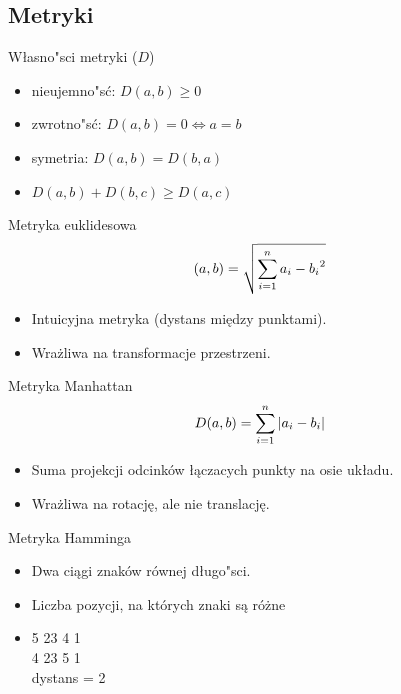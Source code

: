 \subsection{Metryki}
\begin{frame}{Własno"sci metryki ($D$)}
\begin{itemize}
	\item nieujemno"sć: $D(a,b) \ge 0$
	\item zwrotno"sć: $D(a,b) = 0 \Leftrightarrow a = b$
	\item symetria: $D(a,b) = D(b,a)$
	\item $D(a,b) + D(b,c) \ge D(a,c)$
\end{itemize}
\end{frame}

\begin{frame}{Metryka euklidesowa}
\begin{equation}
	\centering
	(a,b) = \sqrt{\sum_{i=1}^n{a_i - b_i}^2}
\end{equation}
\begin{itemize}
	\item Intuicyjna metryka (dystans między punktami).
	\item Wrażliwa na transformacje przestrzeni.
\end{itemize}
\end{frame}

\begin{frame}{Metryka Manhattan}
\begin{equation}
	\centering
	D(a,b) = \sum_{i=1}^n{|a_i - b_i|}
\end{equation}
\begin{itemize}
	\item Suma projekcji odcinków łączacych punkty na osie układu.
	\item Wrażliwa na rotację, ale nie translację.
\end{itemize}
\end{frame}

\begin{frame}{Metryka Hamminga}
\begin{itemize}
	\item Dwa ciągi znaków równej długo"sci.
	\item Liczba pozycji, na których znaki są różne
	\item {\color[rgb]{1,0,0} 5}{\color[rgb]{0,1,0} 	  23}{\color[rgb]{1,0,0} 4}{\color[rgb]{0,1,0} 1} \\
    {\color[rgb]{1,0,0} 4}{\color[rgb]{0,1,0} 23}{\color[rgb]{1,0,0} 5}{\color[rgb]{0,1,0} 1} \\
		  dystans = 2
\end{itemize}
\end{frame}

